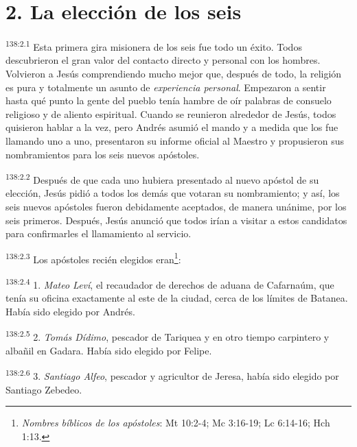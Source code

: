 \section*{2. La elección de los seis}
\par 
\textsuperscript{138:2.1} Esta primera gira misionera de los seis fue todo un éxito. Todos descubrieron el gran valor del contacto directo y personal con los hombres. Volvieron a Jesús comprendiendo mucho mejor que, después de todo, la religión es pura y totalmente un asunto de \textit{experiencia personal}. Empezaron a sentir hasta qué punto la gente del pueblo tenía hambre de oír palabras de consuelo religioso y de aliento espiritual. Cuando se reunieron alrededor de Jesús, todos quisieron hablar a la vez, pero Andrés asumió el mando y a medida que los fue llamando uno a uno, presentaron su informe oficial al Maestro y propusieron sus nombramientos para los seis nuevos apóstoles.

\par 
\textsuperscript{138:2.2} Después de que cada uno hubiera presentado al nuevo apóstol de su elección, Jesús pidió a todos los demás que votaran su nombramiento; y así, los seis nuevos apóstoles fueron debidamente aceptados, de manera unánime, por los seis primeros. Después, Jesús anunció que todos irían a visitar a estos candidatos para confirmarles el llamamiento al servicio.

\par 
\textsuperscript{138:2.3} Los apóstoles recién elegidos eran\footnote{\textit{Nombres bíblicos de los apóstoles}: Mt 10:2-4; Mc 3:16-19; Lc 6:14-16; Hch 1:13.}:

\par 
\textsuperscript{138:2.4} 1. \textit{Mateo Leví}, el recaudador de derechos de aduana de Cafarnaúm, que tenía su oficina exactamente al este de la ciudad, cerca de los límites de Batanea. Había sido elegido por Andrés.

\par 
\textsuperscript{138:2.5} 2. \textit{Tomás Dídimo}, pescador de Tariquea y en otro tiempo carpintero y albañil en Gadara. Había sido elegido por Felipe.

\par 
\textsuperscript{138:2.6} 3. \textit{Santiago Alfeo}, pescador y agricultor de Jeresa, había sido elegido por Santiago Zebedeo.

